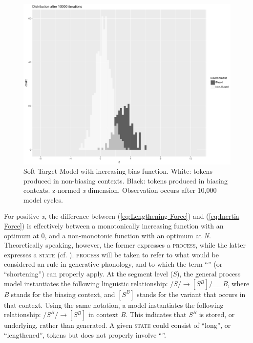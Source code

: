 \begin{figure}[H]
\centering{}\includegraphics[scale=0.3]{figures/BaselineModel10000iter.pdf}\caption{\label{fig:Model2:LengtheningProcess}Soft-Target Model with increasing
bias function. White: tokens produced
in non-biasing contexts. Black: tokens produced in biasing contexts.
z-normed \emph{x} dimension. Observation occurs after 10,000
model cycles.}
\end{figure}

For positive \emph{x}, the difference between (\ref{eq:Lengthening Force})
and (\ref{eq:Inertia Force}) is effectively between a monotonically
increasing function with an optimum at 0, and a non-monotonic function
with an optimum at \emph{N}. Theoretically speaking, however, the
former expresses a \textsc{process}, while the latter expresses a
\textsc{state} (cf. \citealt{Hyman1975}). \textsc{process }will be
taken to refer to what would be considered an  rule in generative
phonology, and to which the term ``'' (or ``shortening'') can
properly apply. At the segment level (\emph{S}), the general process
model instantiates the following linguistic relationship: $/S/\rightarrow[S{}^{B}]/$\emph{\_\_B}\textsc{,
}where\emph{ B} stands for the biasing context, and $[S^{B}]$ stands
for the  variant that occurs in that context. Using the
same notation, a  model instantiates the following relationship:
$/S^{B}/\rightarrow[S{}^{B}]$ in context \emph{B}. This indicates
that $S^{B}$ is stored, or underlying, rather than generated. A given
\textsc{state} could consist of ``long'', or ``lengthened'', tokens but
does not properly involve ``''. 

